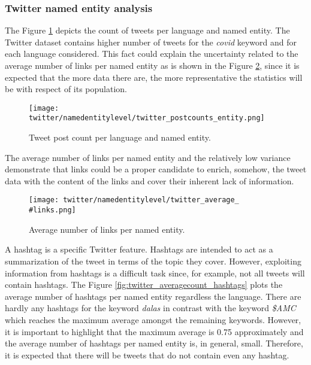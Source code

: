 \subsubsection{Twitter named entity analysis}

The Figure \ref{fig:twitter_postcounts_entity} depicts the count of tweets per language and named entity. The Twitter dataset contains higher number of tweets for the \textit{covid} keyword and for each language considered. This fact could explain the uncertainty related to the average number of links per named entity as is shown in the Figure \ref{fig:twitter_average_links}, since it is expected that the more data there are, the more representative the statistics will be with respect of its population.
\begin{figure}[H]
	\begin{center}
		\texttt{[image: twitter/namedentitylevel/twitter\_postcounts\_entity.png]}
		\caption{Tweet post count per language and named entity.}
		\label{fig:twitter_postcounts_entity}
	\end{center}
\end{figure}

The average number of links per named entity and the relatively low variance demonstrate that links could be a proper candidate to enrich, somehow, the tweet data with the content of the links and cover their inherent lack of information.
\begin{figure}[H]
	\begin{center}
		\texttt{[image: twitter/namedentitylevel/twitter\_average\_\\\#links.png]}
		\caption{Average number of links per named entity.}
		\label{fig:twitter_average_links}
	\end{center}
\end{figure}

\par A hashtag is a specific Twitter feature. Hashtags are intended to act as a summarization of the tweet in terms of the topic they cover. However, exploiting information from hashtags is a difficult task since, for example, not all tweets will contain hashtags. The Figure \ref{fig:twitter_averagecount_hashtags} plots the average number of hashtags per named entity regardless the language. There are hardly any hashtags for the keyword \textit{dalas} in contrast with the keyword \textit{\$AMC} which reaches the maximum average amongst the remaining keywords. However, it is important to highlight that the maximum average is 0.75 approximately and the average number of hashtags per named entity is, in general, small. Therefore, it is expected that there will be tweets that do not contain even any hashtag.

